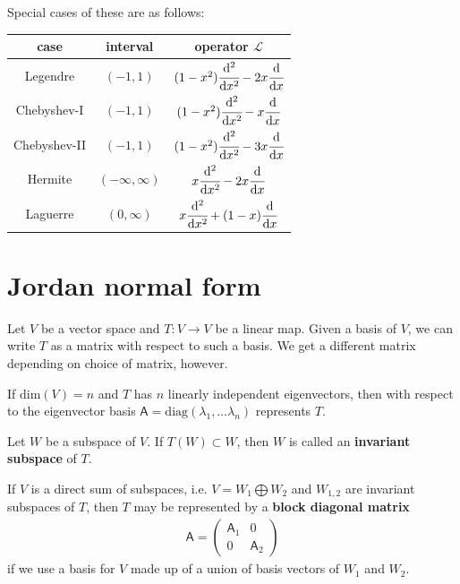 \documentclass[letter-paper]{tufte-book}
\newenvironment{example}[1][Example]{\begin{trivlist}
\item[\hskip \labelsep {\bfseries #1}]}{\end{trivlist}}
\newcommand{\As}{{\mathsf{A}}}
\begin{document}
Special cases of these are as follows:

\begin{center}
\begin{tabular}{c|c|c}
  case & interval & operator $\mathcal{L}$\\
  \hline
  Legendre & $(-1, 1)$ & $(1-x^2)\cfrac{\mathrm{d}^2}{\mathrm{d}x^2} - 2x\cfrac{\mathrm{d}}{\mathrm{d}x}$\\
  Chebyshev-I & $(-1, 1)$ & $(1-x^2)\cfrac{\mathrm{d}^2}{\mathrm{d}x^2} - x\cfrac{\mathrm{d}}{\mathrm{d}x}$\\
  Chebyshev-II & $(-1, 1)$ & $(1-x^2)\cfrac{\mathrm{d}^2}{\mathrm{d}x^2} - 3x\cfrac{\mathrm{d}}{\mathrm{d}x}$\\
  Hermite & $(-\infty, \infty)$ & $x\cfrac{\mathrm{d}^2}{\mathrm{d}x^2} - 2x\cfrac{\mathrm{d}}{\mathrm{d}x}$\\
  Laguerre & $(0, \infty)$ & $x\cfrac{\mathrm{d}^2}{\mathrm{d}x^2} + (1-x)\cfrac{\mathrm{d}}{\mathrm{d}x}$\\
\end{tabular}
\end{center}


\section{Jordan normal form}

Let $V$ be a vector space and $T: V\to V$ be a linear map. Given a basis of $V$, we can write $T$ as a matrix with respect to such a basis. We get a different matrix depending on choice of matrix, however.

\begin{example}
  If $\mbox{dim}(V) = n$ and $T$ has $n$ linearly independent eigenvectors, then with respect to the eigenvector basis $\As = \mbox{diag}(\lambda_1, \ldots \lambda_n)$ represents $T$.
\end{example}

Let $W$ be a subspace of $V$. If $T(W) \subset W$, then $W$ is called an \textbf{invariant subspace} of $T$.

If $V$ is a direct sum of subspaces, i.e. $V = W_1 \bigoplus W_2$ and $W_{1,2}$ are invariant subspaces of $T$, then $T$ may be represented by a \textbf{block diagonal matrix}
\begin{align*}
  \As = \begin{pmatrix}\As_1 & 0 \\ 0 & \As_2 \end{pmatrix}
\end{align*}
if we use a basis for $V$ made up of a union of basis vectors of $W_1$ and $W_2$.
\end{document}
